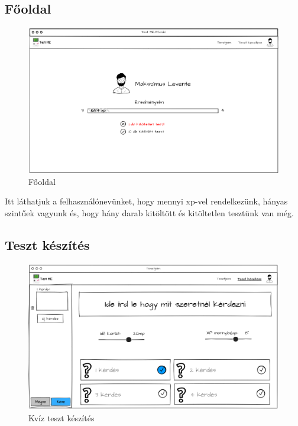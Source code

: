 \subsection{Főoldal}

\begin{figure}[H]
    \centering
    \includegraphics[width=\linewidth]{images/main_login_wireframe.png}
    \caption{Főoldal}
    \label{fig:main_page}
\end{figure}

Itt láthatjuk  a felhasználónevünket, hogy mennyi xp-vel rendelkezünk, hányas szintűek vagyunk és, hogy hány darab kitöltött és kitöltetlen tesztünk van még.

\subsection{Teszt készítés}

\begin{figure}[H]
    \centering
    \includegraphics[width=\linewidth]{images/make_test_wireframe.png}
    \caption{Kvíz teszt készítés}
    \label{fig:new_quiz_question}
\end{figure}


